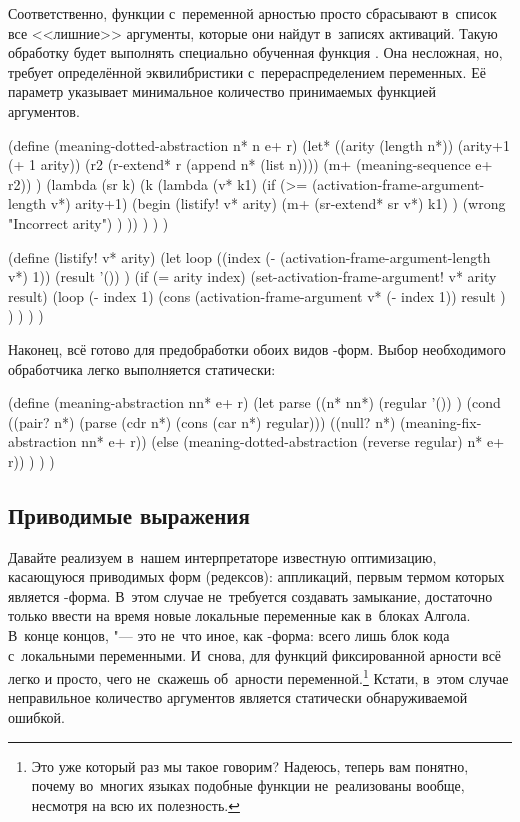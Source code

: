 Соответственно, функции с~переменной арностью просто сбрасывают в~список все
<<лишние>> аргументы, которые они найдут в~записях активаций. Такую обработку
будет выполнять специально обученная функция . Она несложная, но,
требует определённой эквилибристики с~перераспределением переменных. Её параметр
 указывает минимальное количество принимаемых функцией аргументов.

\begin{code:lisp}
(define (meaning-dotted-abstraction n* n e+ r)
  (let* ((arity (length n*))
         (arity+1 (+ 1 arity))
         (r2 (r-extend* r (append n* (list n))))
         (m+ (meaning-sequence e+ r2)) )
    (lambda (sr k)
      (k (lambda (v* k1)
           (if (>= (activation-frame-argument-length v*) arity+1)
               (begin (listify! v* arity)
                      (m+ (sr-extend* sr v*) k1) )
               (wrong "Incorrect arity") ) )) ) ) )

(define (listify! v* arity)
  (let loop ((index (- (activation-frame-argument-length v*) 1))
             (result '()) )
    (if (= arity index)
        (set-activation-frame-argument! v* arity result)
        (loop (- index 1)
              (cons (activation-frame-argument v* (- index 1))
                    result ) ) ) ) )
\end{code:lisp}

Наконец, всё готово для предобработки обоих видов -форм. Выбор
необходимого обработчика легко выполняется статически:

\begin{code:lisp}
(define (meaning-abstraction nn* e+ r)
  (let parse ((n* nn*)
              (regular '()) )
    (cond
     ((pair? n*) (parse (cdr n*) (cons (car n*) regular)))
     ((null? n*) (meaning-fix-abstraction nn* e+ r))
     (else (meaning-dotted-abstraction (reverse regular) n* e+ r)) ) ) )
\end{code:lisp}


\subsection{Приводимые выражения}\label{fast/fast/ssect:reducible}

Давайте реализуем в~нашем интерпретаторе известную оптимизацию, касающуюся
приводимых форм (редексов): аппликаций, первым термом которых является
-форма. В~этом случае не~требуется создавать замыкание, достаточно
только ввести на время новые локальные переменные как в~блоках Алгола. В~конце
концов,  "--- это не~что иное, как -форма:
всего лишь блок кода с~локальными переменными. И~снова, для функций
фиксированной арности всё легко и просто, чего не~скажешь об~арности
переменной.\footnote*{Это уже который раз мы такое говорим? Надеюсь, теперь вам
понятно, почему во~многих языках подобные функции не~реализованы вообще,
несмотря на всю их полезность.} Кстати, в~этом случае неправильное количество
аргументов является статически обнаруживаемой ошибкой.


